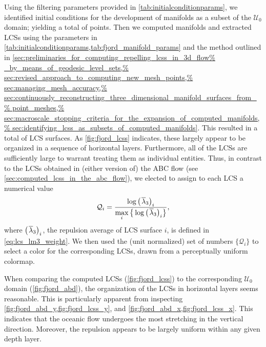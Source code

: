 Using the filtering parameters provided in \cref{tab:initialconditionparams},
we identified initial conditions for the development of manifolds as a subset
of the $\mathcal{U}_{0}$ domain; yielding a total of  points.
Then we computed manifolds and extracted LCSs using the parameters
in \cref{tab:initialconditionparams,tab:fjord_manifold_params} and the method
outlined in \cref{sec:preliminaries_for_computing_repelling_lcss_in_3d_flow%
    _by_means_of_geodesic_level_sets,%
    sec:revised_approach_to_computing_new_mesh_points,%
    sec:managing_mesh_accuracy,%
    sec:continuously_reconstructing_three_dimensional_manifold_surfaces_from_%
    point_meshes,%
    sec:macroscale_stopping_criteria_for_the_expansion_of_computed_manifolds,%
    sec:identifying_lcss_as_subsets_of_computed_manifolds}. This resulted in
a total of  LCS surfaces. As \cref{fig:fjord_lcss} indicates,
these largely appear to be organized in a sequence of horizontal layers.
Furthermore, all of the LCSs are sufficiently large to warrant treating them
as individual entities. Thus, in contrast to the LCSs obtained in (either
version of) the ABC flow (see \cref{sec:computed_lcss_in_the_abc_flow}), we
elected to assign to each LCS a numerical value
\begin{equation}
    \label{eq:fjord_lcs_colorscaling}
    \mathcal{Q}_{i} = %
    \frac{\log{{\big({\mkern2mu}\overline{\lambda}_{3}\big)}_{i}}}%
    {\max\limits_{i}%
    \big\{\log{{\big({\mkern2mu}\overline{\lambda}_{3}\big)}_{i}}\big\}},
\end{equation}
where ${\big({\mkern2mu}\overline{\lambda}_{3}}\big)_{i}$, the repulsion
average of LCS surface $i$, is defined in \cref{eq:lcs_lm3_weight}. We then
used the (unit normalized) set of numbers $\big\{\mathcal{Q}_{i}\big\}$ to
select a color for the corresponding LCSs, drawn from a perceptually uniform
colormap.





When comparing the computed LCSs (\cref{fig:fjord_lcss}) to the corresponding
$\mathcal{U}_{0}$ domain (\cref{fig:fjord_abd}), the organization of
the LCSs in horizontal layers seems reasonable. This is particularly apparent
from inspecting \cref{fig:fjord_abd_y,fig:fjord_lcss_y}, and
\cref{fig:fjord_abd_x,fig:fjord_lcss_x}. This indicates that the oceanic
flow undergoes the most stretching in the vertical direction. Moreover, the
repulsion appears to be largely uniform within any given depth layer.


